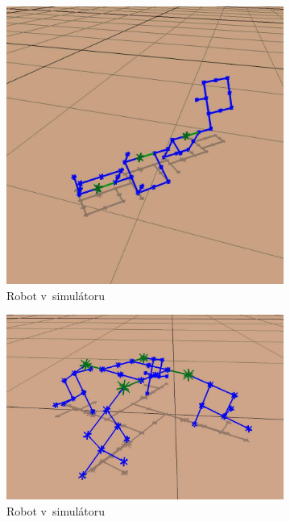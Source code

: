 \begin{figure}
    \centering
    \begin{subfigure}{.33\textwidth}
        \centering
        \includegraphics[width=.9\linewidth]{obrazky/hornby_model_2_simulace.png}
        \caption{Robot v~simulátoru}
        \label{fig:hornby_roboti_real}
    \end{subfigure}
    \begin{subfigure}{.33\textwidth}
        \centering
        \includegraphics[width=.9\linewidth]{obrazky/hornby_model_1_simulace.png}
        \caption{Robot v~simulátoru}
        \label{fig:hornby_roboti_1_simulace}
    \end{subfigure}%
    \begin{subfigure}{.33\textwidth}

\end{subfigure}
\end{figure}
